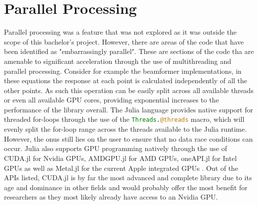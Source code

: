 \section{Parallel Processing}
Parallel processing was a feature that was not explored as it was outside the scope of this bachelor's project. However,
there are areas of the code that have been identified as "embarrassingly parallel". These are sections of the code tha
are amenable to significant acceleration through the use of multithreading and parallel processing. Consider for example
the beamformer implementations, in these equations the response at each point is calculated independently of all the
other points. As such this operation can be easily split across all available threads or even all available GPU cores,
providing exponential increases to the performance of the library overall. The Julia language provides native support
for threaded for-loops through the use of the \lstinline[language=Julia]{Threads.@threads} macro, which will evenly split the
for-loop range across the threads available to the Julia runtime. However, the onus still lies on the user to ensure
that no data race conditions can occur. Julia also supports GPU programming natively through the use of CUDA.jl for
Nvidia GPUs, AMDGPU.jl for AMD GPUs, oneAPI.jl for Intel GPUs as well as Metal.jl for the current Apple integrated GPUs
\cite{JuliaGPU}. Out of the APIs listed, CUDA.jl is by far the most advanced and complete library due to its age and
dominance in other fields and would probably offer the most benefit for researchers as they most likely already have
access to an Nvidia GPU.